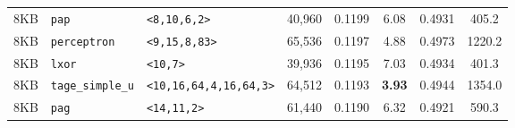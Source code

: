 \documentclass[11pt,a4paper,twocolumn]{article}
\begin{document}
\begin{table}[htbp]
{\begin{tabular}{|l l l H c c c c|}
    8KB & \texttt{pap} & \texttt{<8,10,6,2>} & 40,960 & 0.1199 & 6.08 & 0.4931 & 405.2 \\
    8KB & \texttt{perceptron} & \texttt{<9,15,8,83>} & 65,536 & 0.1197 & 4.88 & 0.4973 & 1220.2 \\
    8KB & \texttt{lxor} & \texttt{<10,7>} & 39,936 & 0.1195 & 7.03 & 0.4934 & 401.3 \\
    8KB & \texttt{tage\_simple\_u} & \texttt{<10,16,64,4,16,64,3>} & 64,512 & 0.1193 & \textbf{3.93} & 0.4944 & 1354.0 \\
    8KB & \texttt{pag} & \texttt{<14,11,2>} & 61,440 & 0.1190 & 6.32 & 0.4921 & 590.3 \\
    \hline
    \end{tabular}%
    }
    \label{table:scalar_avg_performance}
\end{table}




\end{document}
